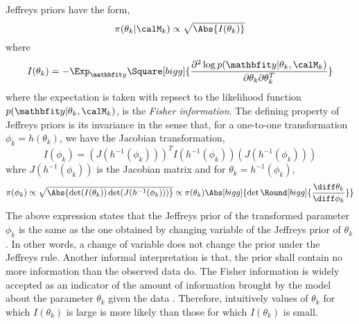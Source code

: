Jeffreys priors \cite{Jeffreys:1946jf} have the form,
\begin{equation}
  \pi(\theta_k|\calM_k)\propto\sqrt{\Abs{I(\theta_k)}}
\end{equation}
where
\begin{equation}
  I(\theta_k)
  = -\Exp_{\data}\Square[bigg]{\frac{\partial^2\log p(\data|\theta_k,\calM_k)}
    {\partial\theta_k\partial\theta_k^T}}
\end{equation}
where the expectation is taken with repsect to the likelihood function
$p(\data|\theta_k,\calM_k)$, is the \emph{Fisher information}. The defining
property of Jeffreys priors is its invariance in the sense that, for a
one-to-one transformation $\phi_k = h(\theta_k)$, we have the Jacobian
transformation,
\begin{equation*}
  I(\phi_k) = (J(h^{-1}(\phi_k)))^T I(h^{-1}(\phi_k)) 
  (J(h^{-1}(\phi_k)))
\end{equation*}
whre $J(h^{-1}(\phi_k))$ is the Jacobian matrix and for $\theta_k =
h^{-1}(\phi_k)$,
\begin{equation*}
  \pi(\phi_k)
  \propto \sqrt{\Abs{\det(I(\theta_k))\det(J(h^{-1}(\phi_k)))}}
  \propto \pi(\theta_k)
  \Abs[bigg]{\det\Round[bigg]{\frac{\diff\theta_k}{\diff\phi_k}}}
\end{equation*}
The above expression states that the Jeffreys prior of the transformed
parameter $\phi_k$ is the same as the one obtained by changing variable of
the Jeffreys prior of $\theta_k$. In other words, a change of variable does
not change the prior under the Jeffreys rule. Another informal interpretation
is that, the prior shall contain no more information than the observed data
do. The Fisher information is widely accepted as an indicator of the amount
of information brought by the model about the parameter $\theta_k$ given the
data \cite{Fisher:1956vx}. Therefore, intuitively values of $\theta_k$ for
which $I(\theta_k)$ is large is more likely than those for which
$I(\theta_k)$ is small.

